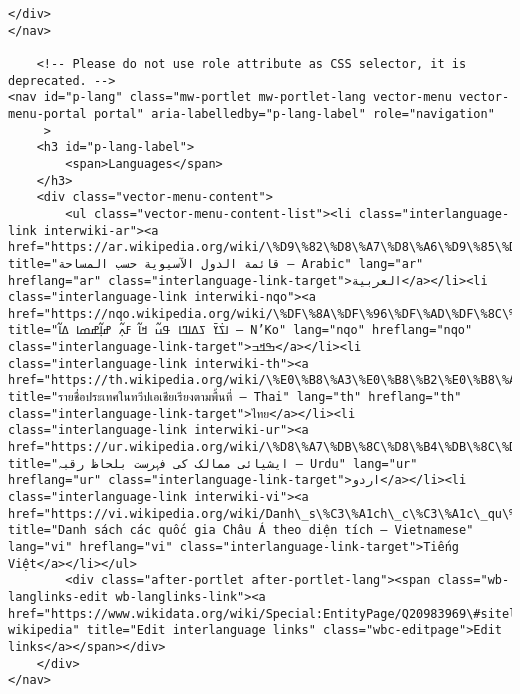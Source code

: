 \documentclass[11pt]{article}
\begin{document}
\begin{Verbatim}[commandchars=\\\{\}]
	</div>
</nav>

	<!-- Please do not use role attribute as CSS selector, it is deprecated. -->
<nav id="p-lang" class="mw-portlet mw-portlet-lang vector-menu vector-menu-portal portal" aria-labelledby="p-lang-label" role="navigation" 
	 >
	<h3 id="p-lang-label">
		<span>Languages</span>
	</h3>
	<div class="vector-menu-content">
		<ul class="vector-menu-content-list"><li class="interlanguage-link interwiki-ar"><a href="https://ar.wikipedia.org/wiki/\%D9\%82\%D8\%A7\%D8\%A6\%D9\%85\%D8\%A9\_\%D8\%A7\%D9\%84\%D8\%AF\%D9\%88\%D9\%84\_\%D8\%A7\%D9\%84\%D8\%A2\%D8\%B3\%D9\%8A\%D9\%88\%D9\%8A\%D8\%A9\_\%D8\%AD\%D8\%B3\%D8\%A8\_\%D8\%A7\%D9\%84\%D9\%85\%D8\%B3\%D8\%A7\%D8\%AD\%D8\%A9" title="قائمة الدول الآسيوية حسب المساحة – Arabic" lang="ar" hreflang="ar" class="interlanguage-link-target">العربية</a></li><li class="interlanguage-link interwiki-nqo"><a href="https://nqo.wikipedia.org/wiki/\%DF\%8A\%DF\%96\%DF\%AD\%DF\%8C\%DF\%AB\_\%DF\%96\%DF\%A1\%DF\%8A\%DF\%A3\%DF\%8A\_\%DF\%9F\%DF\%8E\%DF\%AC\_\%DF\%9E\%DF\%8A\%DF\%AC\_\%DF\%93\%DF\%8D\%DF\%B2\%DF\%AC\_\%DF\%9D\%DF\%8A\%DF\%B2\%DF\%AC\%DF\%9D\%DF\%98\%DF\%8A\_\%DF\%A1\%DF\%8A\%DF\%AC" title="ߊߖ߭ߌ߫ ߖߡߊߣߊ ߟߎ߬ ߞߊ߬ ߓߍ߲߬ ߝߊ߲߬ߝߘߊ ߡߊ߬ – N’Ko" lang="nqo" hreflang="nqo" class="interlanguage-link-target">ߒߞߏ</a></li><li class="interlanguage-link interwiki-th"><a href="https://th.wikipedia.org/wiki/\%E0\%B8\%A3\%E0\%B8\%B2\%E0\%B8\%A2\%E0\%B8\%8A\%E0\%B8\%B7\%E0\%B9\%88\%E0\%B8\%AD\%E0\%B8\%9B\%E0\%B8\%A3\%E0\%B8\%B0\%E0\%B9\%80\%E0\%B8\%97\%E0\%B8\%A8\%E0\%B9\%83\%E0\%B8\%99\%E0\%B8\%97\%E0\%B8\%A7\%E0\%B8\%B5\%E0\%B8\%9B\%E0\%B9\%80\%E0\%B8\%AD\%E0\%B9\%80\%E0\%B8\%8A\%E0\%B8\%B5\%E0\%B8\%A2\%E0\%B9\%80\%E0\%B8\%A3\%E0\%B8\%B5\%E0\%B8\%A2\%E0\%B8\%87\%E0\%B8\%95\%E0\%B8\%B2\%E0\%B8\%A1\%E0\%B8\%9E\%E0\%B8\%B7\%E0\%B9\%89\%E0\%B8\%99\%E0\%B8\%97\%E0\%B8\%B5\%E0\%B9\%88" title="รายชื่อประเทศในทวีปเอเชียเรียงตามพื้นที่ – Thai" lang="th" hreflang="th" class="interlanguage-link-target">ไทย</a></li><li class="interlanguage-link interwiki-ur"><a href="https://ur.wikipedia.org/wiki/\%D8\%A7\%DB\%8C\%D8\%B4\%DB\%8C\%D8\%A7\%D8\%A6\%DB\%8C\_\%D9\%85\%D9\%85\%D8\%A7\%D9\%84\%DA\%A9\_\%DA\%A9\%DB\%8C\_\%D9\%81\%DB\%81\%D8\%B1\%D8\%B3\%D8\%AA\_\%D8\%A8\%D9\%84\%D8\%AD\%D8\%A7\%D8\%B8\_\%D8\%B1\%D9\%82\%D8\%A8\%DB\%81" title="ایشیائی ممالک کی فہرست بلحاظ رقبہ – Urdu" lang="ur" hreflang="ur" class="interlanguage-link-target">اردو</a></li><li class="interlanguage-link interwiki-vi"><a href="https://vi.wikipedia.org/wiki/Danh\_s\%C3\%A1ch\_c\%C3\%A1c\_qu\%E1\%BB\%91c\_gia\_Ch\%C3\%A2u\_\%C3\%81\_theo\_di\%E1\%BB\%87n\_t\%C3\%ADch" title="Danh sách các quốc gia Châu Á theo diện tích – Vietnamese" lang="vi" hreflang="vi" class="interlanguage-link-target">Tiếng Việt</a></li></ul>
		<div class="after-portlet after-portlet-lang"><span class="wb-langlinks-edit wb-langlinks-link"><a href="https://www.wikidata.org/wiki/Special:EntityPage/Q20983969\#sitelinks-wikipedia" title="Edit interlanguage links" class="wbc-editpage">Edit links</a></span></div>
	</div>
</nav>


\end{Verbatim}
\end{document}
